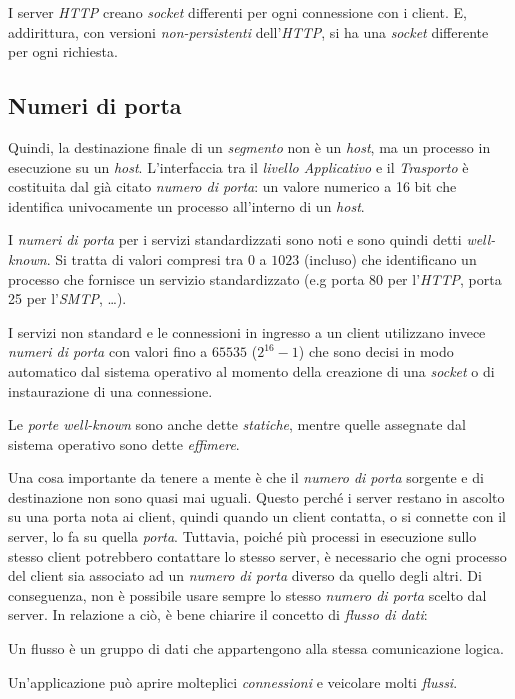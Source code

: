 \begin{note}
    I server \emph{HTTP} creano \emph{socket} differenti per ogni connessione con
    i client. E, addirittura, con versioni \emph{non-persistenti} dell'\emph{HTTP},
    si ha una \emph{socket} differente per ogni richiesta.
\end{note}

\subsection{Numeri di porta}
Quindi, la destinazione finale di un \emph{segmento} non è un \emph{host}, ma un processo
in esecuzione su un \emph{host}. L'interfaccia tra il \emph{livello Applicativo} e il
\emph{Trasporto} è costituita dal già citato \emph{numero di porta}: un valore
numerico a 16 bit che identifica univocamente un processo all'interno di un
\emph{host}.

I \emph{numeri di porta} per i servizi standardizzati sono noti e sono quindi detti
\emph{well-known}. Si tratta di valori compresi tra $0$ a $1023$ (incluso) che
identificano un processo che fornisce un servizio standardizzato (e.g porta 80
per l'\emph{HTTP}, porta 25 per l'\emph{SMTP}, \dots).

\noindent
I servizi non standard e le connessioni in ingresso a un client utilizzano invece
\emph{numeri di porta} con valori fino a $65535$ ($2^{16}-1$) che sono decisi in
modo automatico dal sistema operativo al momento della creazione di una
\emph{socket} o di instaurazione di una connessione.

\begin{note}
    Le \emph{porte well-known} sono anche dette \emph{statiche}, mentre quelle
    assegnate dal sistema operativo sono dette \emph{effimere}.
\end{note}\noindent
Una cosa importante da tenere a mente è che il \emph{numero di porta} sorgente e
di destinazione non sono quasi mai uguali.
Questo perché i server restano in ascolto su una porta nota ai client, quindi
quando un client contatta, o si connette con il server, lo fa su quella
\emph{porta}. Tuttavia, poiché più processi in esecuzione sullo stesso client
potrebbero contattare lo stesso server, è necessario che ogni processo del
client sia associato ad un \emph{numero di porta} diverso da quello degli altri.
Di conseguenza, non è possibile usare sempre lo stesso \emph{numero di porta}
scelto dal server. In relazione a ciò, è bene chiarire il concetto di
\emph{flusso di dati}:
\begin{definition}
    Un flusso è un gruppo di dati che appartengono alla stessa comunicazione
    logica.
\end{definition}
\begin{note}
    Un'applicazione può aprire molteplici \emph{connessioni} e veicolare
    molti \emph{flussi}.
\end{note}

